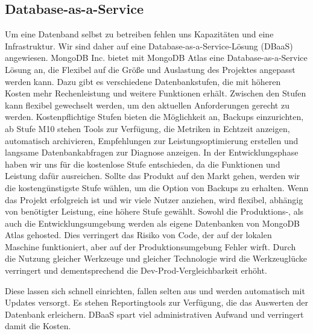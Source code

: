 \subsection{Database-as-a-Service}
Um eine Datenband selbst zu betreiben fehlen uns Kapazitäten und eine Infrastruktur. Wir sind daher auf eine Database-as-a-Service-Lösung (DBaaS) angewiesen. 
MongoDB Inc. bietet mit MongoDB Atlas eine Database-as-a-Service Lösung an, die Flexibel auf die Größe und Auslastung des Projektes angepasst werden kann. Dazu gibt es verschiedene Datenbankstufen, die mit höheren Kosten mehr Rechenleistung und weitere Funktionen erhält. Zwischen den Stufen kann flexibel gewechselt werden, um den aktuellen Anforderungen gerecht zu werden. Kostenpflichtige Stufen bieten die Möglichkeit an, Backups einzurichten, ab Stufe M10 stehen Tools zur Verfügung, die Metriken in Echtzeit anzeigen, automatisch archivieren, Empfehlungen zur Leistungsoptimierung erstellen und langsame Datenbankabfragen zur Diagnose anzeigen. In der Entwicklungsphase haben wir uns für die kostenlose Stufe entschieden, da die Funktionen und Leistung dafür ausreichen. Sollte das Produkt auf den Markt gehen, werden wir die kostengünstigste Stufe wählen, um die Option von Backups zu erhalten. Wenn das Projekt erfolgreich ist und wir viele Nutzer anziehen, wird flexibel, abhängig von benötigter Leistung, eine höhere Stufe gewählt.
Sowohl die Produktions-, als auch die Entwicklungsumgebung werden als eigene Datenbanken von MongoDB Atlas gehosted. Dies verringert das Risiko von Code, der auf der lokalen Maschine funktioniert, aber auf der Produktionsumgebung Fehler wirft. Durch die Nutzung gleicher Werkzeuge und gleicher Technologie wird die Werkzeuglücke verringert und dementsprechend die Dev-Prod-Vergleichbarkeit erhöht. \cite{12FA1}

Diese lassen sich schnell einrichten, fallen selten aus und werden automatisch mit Updates versorgt. Es stehen Reportingtools zur Verfügung, die das Auswerten der Datenbank erleichern. DBaaS spart viel administrativen Aufwand und verringert damit die Kosten.

